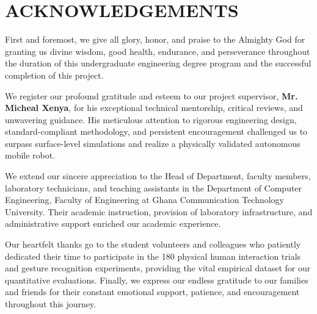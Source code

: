 \chapter*{ACKNOWLEDGEMENTS}

First and foremost, we give all glory, honor, and praise to the Almighty God for granting us divine wisdom, good health, endurance, and perseverance throughout the duration of this undergraduate engineering degree program and the successful completion of this project.

We register our profound gratitude and esteem to our project supervisor, \textbf{Mr. Micheal Xenya}, for his exceptional technical mentorship, critical reviews, and unwavering guidance. His meticulous attention to rigorous engineering design, standard-compliant methodology, and persistent encouragement challenged us to surpass surface-level simulations and realize a physically validated autonomous mobile robot.

We extend our sincere appreciation to the Head of Department, faculty members, laboratory technicians, and teaching assistants in the Department of Computer Engineering, Faculty of Engineering at Ghana Communication Technology University. Their academic instruction, provision of laboratory infrastructure, and administrative support enriched our academic experience.

Our heartfelt thanks go to the student volunteers and colleagues who patiently dedicated their time to participate in the 180 physical human interaction trials and gesture recognition experiments, providing the vital empirical dataset for our quantitative evaluations. Finally, we express our endless gratitude to our families and friends for their constant emotional support, patience, and encouragement throughout this journey.
